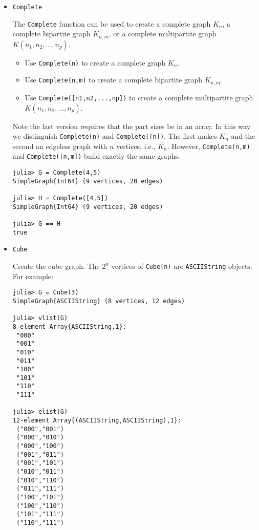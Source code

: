 \documentclass[oneside]{amsart}
\begin{document}
\begin{itemize}
  \item \verb|Complete|

    The \verb|Complete| function can be used to create a complete
    graph $K_n$, a complete bipartite graph $K_{n,m}$, or a complete
    multipartite graph $K(n_1,n_2,\ldots,n_p)$.

    \begin{itemize}
    \item Use \verb|Complete(n)| to create a complete graph $K_n$.

    \item Use \verb|Complete(n,m)| to create a complete bipartite
      graph $K_{n,m}$.


    \item Use \verb|Complete([n1,n2,...,np])| to create a complete
      multipartite graph $K(n_1,n_2,\ldots,n_p)$.
    \end{itemize}

    Note the last version requires that the part sizes be in an
    array. In this way we distinguish \verb|Complete(n)| and
    \verb|Complete([n])|. The first makes $K_n$ and the second an
    edgeless graph with $n$ vertices, i.e., $\overline{K_n}$.
    However, \verb|Complete(n,m)| and \verb|Complete([n,m])| build
    exactly the same graphs.
    \small
\begin{verbatim}
julia> G = Complete(4,5)
SimpleGraph{Int64} (9 vertices, 20 edges)

julia> H = Complete([4,5])
SimpleGraph{Int64} (9 vertices, 20 edges)

julia> G == H
true
\end{verbatim}
\normalsize

  \item \verb|Cube|

    Create the cube graph. The $2^n$ vertices of \verb|Cube(n)| are
    \verb|ASCIIString| objects. For example:
\small
\begin{verbatim}
julia> G = Cube(3)
SimpleGraph{ASCIIString} (8 vertices, 12 edges)

julia> vlist(G)
8-element Array{ASCIIString,1}:
 "000"
 "001"
 "010"
 "011"
 "100"
 "101"
 "110"
 "111"

julia> elist(G)
12-element Array{(ASCIIString,ASCIIString),1}:
 ("000","001")
 ("000","010")
 ("000","100")
 ("001","011")
 ("001","101")
 ("010","011")
 ("010","110")
 ("011","111")
 ("100","101")
 ("100","110")
 ("101","111")
 ("110","111")
\end{verbatim}
\normalsize



\end{itemize}
\end{document}
